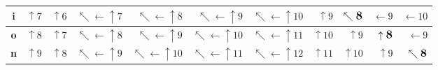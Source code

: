 \documentclass[dvisvgm,tikz,10pt]{article}
\begin{document}
\begin{tabular}{|c|r|r|r|r|r|r|r|r|r|r|}
  \hline
  \textbf{i} & $\uparrow 7$ & $\uparrow 6$ & $\nwarrow\leftarrow\uparrow 7$ & $\nwarrow\leftarrow\uparrow 8$ & $\nwarrow\leftarrow\uparrow 9$ & $\nwarrow\leftarrow\uparrow 10$ & $\uparrow  9$ & \cellcolor{LightCyan}$\nwarrow \textbf{\large 8}$ & $\leftarrow 9$ & $\leftarrow 10$ \\
  \hline
  \textbf{o} & $\uparrow 8$ & $\uparrow 7$ & $\nwarrow\leftarrow\uparrow 8$ & $\nwarrow\leftarrow\uparrow 9$ & $\nwarrow\leftarrow\uparrow 10$ & $\nwarrow\leftarrow\uparrow 11$ & $\uparrow 10$ & $\uparrow 9$ & \cellcolor{LightCyan}$\uparrow \textbf{\large 8}$ & $\leftarrow 9$ \\
  \hline
  \textbf{n} & $\uparrow 9$ & $\uparrow 8$ & $\nwarrow\leftarrow\uparrow 9$ & $\nwarrow\leftarrow\uparrow 10$ & $\nwarrow\leftarrow\uparrow 11$ & $\nwarrow\leftarrow\uparrow 12$ & $\uparrow 11$ & $\uparrow 10$ & $\uparrow 9$ & \cellcolor{LightCyan}$\nwarrow \textbf{\large 8}$ \\
  \hline
\end{tabular}
\egroup
\end{document}
